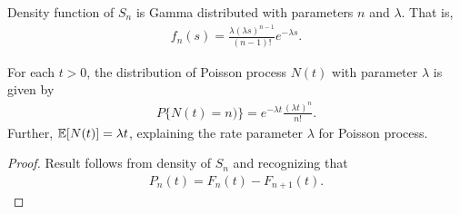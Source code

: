 \documentclass[a4paper,10pt,english]{article}
\begin{document}
\begin{thm} Density function of $S_n$ is Gamma distributed with parameters $n$ and $\lambda$. That is,
\begin{align*}
f_{n}(s) =\frac{\lambda (\lambda s)^{n-1}} {(n-1)!} e^{-\lambda s}.
\end{align*}
\end{thm}

\begin{thm} For each $t >0$, the distribution of Poisson process $N(t)$ with parameter $\lambda$ is given by
	\begin{align*}
	P\{N(t)=n)\}= e^{-\lambda t}\frac{(\lambda t)^{n}}{n!}.
	\end{align*}
Further, $\mathbb{E}[N(t)] = \lambda t$, explaining the rate parameter $\lambda$ for Poisson process.
\end{thm}
\begin{proof}
Result follows from density of $S_n$ and recognizing that 
\begin{align*}
P_n(t) = F_n(t) - F_{n+1}(t).
\end{align*}
\end{proof}
\end{document}
